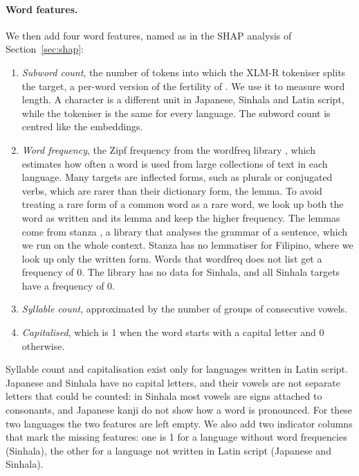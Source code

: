 \documentclass[11pt]{article}
\begin{document}
\paragraph{Word features.} We then add four word features, named as in the SHAP analysis of Section~\ref{sec:shap}: %
\begin{enumerate}
\item \emph{Subword count}, the number of tokens into which the XLM-R tokeniser splits the target, %
a per-word version of the fertility of \citet{rust-etal-2021-good}. We use it to measure word
length. A character is a different unit in Japanese, Sinhala and Latin script, while the tokeniser
is the same for every language. The subword count is centred like the embeddings. %
\item \emph{Word frequency}, the Zipf frequency from the wordfreq library \citep{speer-2022-wordfreq}, %
which estimates how often a word is used from large collections of text in each language. Many
targets are
inflected forms, such as plurals or conjugated verbs, which are rarer than their dictionary form,
the lemma. To avoid treating a rare form of a common word as a rare word, we look up both the word %
as written and its lemma and keep the higher frequency. The lemmas come from stanza
\citep{qi-etal-2020-stanza}, a library that analyses the grammar of a sentence, which we run on %
the whole context. Stanza has no lemmatiser for Filipino, where we look up only the written form. %
Words that wordfreq does not list get a frequency of 0. The library has no data for Sinhala, and all %
Sinhala targets have a frequency of 0. %
\item \emph{Syllable count}, approximated by the number of groups of consecutive vowels. %
\item \emph{Capitalised}, which is 1 when the word starts with a capital letter and 0 otherwise.
\end{enumerate}
Syllable count and capitalisation exist only for languages written in Latin script. Japanese and %
Sinhala have no capital letters, and their vowels are not separate letters that could be counted:
in Sinhala most vowels are signs attached to consonants, and Japanese kanji do not show how a word
is pronounced. For these two languages the two features are left empty. We also add two indicator %
columns that mark the missing features: one is 1 for a language without word frequencies
(Sinhala), the other for a language not written in Latin script (Japanese and Sinhala). %
\end{document}
